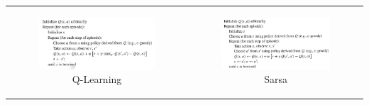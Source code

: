 \documentclass[a4paper,12pt]{article}
\begin{document}
  
        \begin{center}
	\begin{tabular}{cc}
	  \hspace*{-1cm}
	  \begin{minipage}[b]{.52\linewidth}
	    \begin{figure}[H]
	      \includegraphics[width=270px]{QLearning}
	      \caption{ Q-Learning  }
	    \end{figure}
	  \end{minipage}
	  &
	  \begin{minipage}[b]{.5\linewidth}
	    \begin{figure}[H]
	      \includegraphics[width=270px]{Sarsa}
	      \caption{ Sarsa  }
	    \end{figure}
	  \end{minipage}
	\end{tabular}
      \end{center} 
      
  
  
\end{document}
